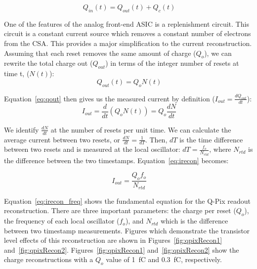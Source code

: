 \begin{equation}~\label{eq:qin}
Q_{in}(t) = Q_{out}(t) + Q_{c}(t)
\end{equation}

One of the features of the analog front-end ASIC is a replenishment circuit.
This circuit is a constant current source which removes a constant number of electrons from the CSA.
This provides a major simplification to the current reconstruction.
Assuming that each reset removes the same amount of charge ($Q_{o}$), we can rewrite the total charge out ($Q_{out}$) in terms of the integer number of resets at time t, ($N(t)$):
\begin{equation}~\label{eq:qout}
Q_{out}(t) = Q_{o} N(t)
\end{equation}

Equation~\ref{eq:qout} then gives us the measured current by definition ($I_{out} = \frac{dQ_{out}}{dt}$):
\begin{equation}~\label{eq:irecon}
I_{out} = \frac{d}{dt}(Q_{o}N(t)) = Q_{o}\frac{dN}{dt}
\end{equation}

We identify $\frac{dN}{dt}$ at the number of resets per unit time.
We can calculate the average current between two resets, or $\frac{dN}{dt} = \frac{1}{dT}$.
Then, $dT$ is the time difference between two resets and is measured at the local oscillator: $dT = \frac{f_{o}}{N_{rtd}}$, where $N_{rtd}$ is the difference between the two timestamps.
Equation~\ref{eq:irecon} becomes:

\begin{equation}~\label{eq:irecon_freq}
\boxed{I_{out} = \frac{Q_{o}f_{o}}{N_{rtd}}}
\end{equation}

Equation~\ref{eq:irecon_freq} shows the fundamental equation for the Q-Pix readout reconstruction.
There are three important parameters: the charge per reset ($Q_{o}$), the frequency of each local oscillator ($f_{o}$), and $N_{rtd}$ which is the difference between two timestamp measurements.
Figures which demonstrate the transistor level effects of this reconstruction are shown in Figures~\ref{fig:qpixRecon1} and~\ref{fig:qpixRecon2}.
Figures~\ref{fig:qpixRecon1} and~\ref{fig:qpixRecon2} show the charge reconstructions with a $Q_{o}$ value of 1~\unit{fC} and 0.3~\unit{fC}, respectively.

